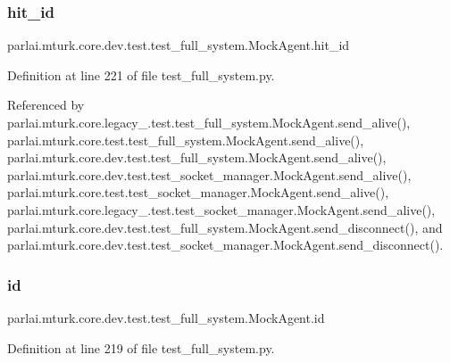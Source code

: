 \subsubsection{\texorpdfstring{hit\+\_\+id}{hit\_id}}
{\footnotesize\ttfamily parlai.\+mturk.\+core.\+dev.\+test.\+test\+\_\+full\+\_\+system.\+Mock\+Agent.\+hit\+\_\+id}



Definition at line 221 of file test\+\_\+full\+\_\+system.\+py.



Referenced by parlai.\+mturk.\+core.\+legacy\+\_.\+test.\+test\+\_\+full\+\_\+system.\+Mock\+Agent.\+send\+\_\+alive(), parlai.\+mturk.\+core.\+test.\+test\+\_\+full\+\_\+system.\+Mock\+Agent.\+send\+\_\+alive(), parlai.\+mturk.\+core.\+dev.\+test.\+test\+\_\+full\+\_\+system.\+Mock\+Agent.\+send\+\_\+alive(), parlai.\+mturk.\+core.\+dev.\+test.\+test\+\_\+socket\+\_\+manager.\+Mock\+Agent.\+send\+\_\+alive(), parlai.\+mturk.\+core.\+test.\+test\+\_\+socket\+\_\+manager.\+Mock\+Agent.\+send\+\_\+alive(), parlai.\+mturk.\+core.\+legacy\+\_.\+test.\+test\+\_\+socket\+\_\+manager.\+Mock\+Agent.\+send\+\_\+alive(), parlai.\+mturk.\+core.\+dev.\+test.\+test\+\_\+full\+\_\+system.\+Mock\+Agent.\+send\+\_\+disconnect(), and parlai.\+mturk.\+core.\+dev.\+test.\+test\+\_\+socket\+\_\+manager.\+Mock\+Agent.\+send\+\_\+disconnect().

\mbox{\label{classparlai_1_1mturk_1_1core_1_1dev_1_1test_1_1test__full__system_1_1MockAgent_a04c6c8c75085c45b9fe37bc998bbcb9a}} 
\subsubsection{\texorpdfstring{id}{id}}
{\footnotesize\ttfamily parlai.\+mturk.\+core.\+dev.\+test.\+test\+\_\+full\+\_\+system.\+Mock\+Agent.\+id}



Definition at line 219 of file test\+\_\+full\+\_\+system.\+py.



